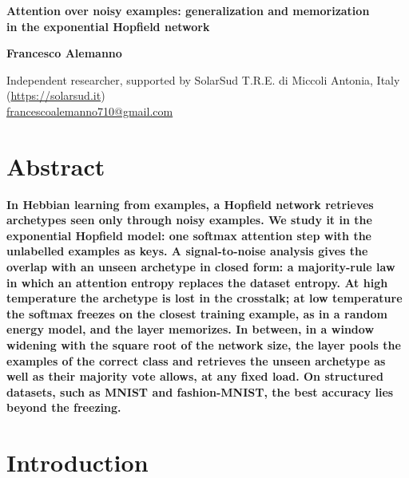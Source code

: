 \documentclass[11pt,a4paper]{article}
\renewenvironment{abstract}{\section*{Abstract}\bfseries}{\par}
\begin{document}
\thispagestyle{fancy}

\begin{center}{\Large\bfseries\color{headblue}
Attention over noisy examples: generalization and memorization\\ in the exponential Hopfield network
\par}\end{center}

\begin{center}\textbf{Francesco Alemanno\,}\end{center}

\begin{center}
Independent researcher, supported by SolarSud T.R.E. di Miccoli Antonia, Italy (\url{https://solarsud.it})
\\[\baselineskip]
\href{mailto:francescoalemanno710@gmail.com}{\small francescoalemanno710@gmail.com}
\end{center}

\begin{abstract}
\noindent
In Hebbian learning from examples, a Hopfield network retrieves archetypes seen only through noisy examples. We study it in the exponential Hopfield model: one softmax attention step with the unlabelled examples as keys. A signal-to-noise analysis gives the overlap with an unseen archetype in closed form: a majority-rule law in which an attention entropy replaces the dataset entropy. At high temperature the archetype is lost in the crosstalk; at low temperature the softmax freezes on the closest training example, as in a random energy model, and the layer memorizes. In between, in a window widening with the square root of the network size, the layer pools the examples of the correct class and retrieves the unseen archetype as well as their majority vote allows, at any fixed load. On structured datasets, such as MNIST and fashion-MNIST, the best accuracy lies beyond the freezing.
\end{abstract}

\vspace{\baselineskip}

\section{Introduction}
\end{document}
